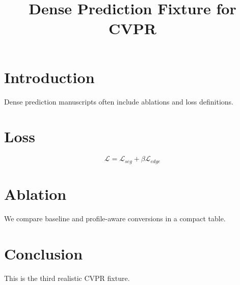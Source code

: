 \documentclass[conference]{IEEEtran}
\begin{document}
\title{Dense Prediction Fixture for CVPR}
\author{}
\maketitle
\section{Introduction}
Dense prediction manuscripts often include ablations and loss definitions.
\section{Loss}
\begin{equation}
  \mathcal{L} = \mathcal{L}_{seg} + \beta \mathcal{L}_{edge}
\end{equation}
\section{Ablation}
We compare baseline and profile-aware conversions in a compact table.
\section{Conclusion}
This is the third realistic CVPR fixture.
\end{document}
